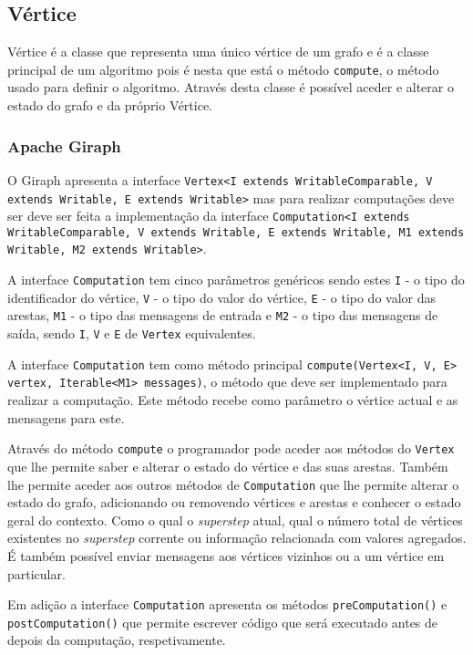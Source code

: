 \newpage
\subsection{Vértice}
Vértice é a classe que representa uma único vértice de um grafo e é a classe principal de um algoritmo pois é nesta que está o método \texttt{compute}, o método usado para definir o algoritmo. Através desta classe é possível aceder e alterar o estado do grafo e da próprio Vértice.
\subsubsection*{Apache Giraph}


O Giraph apresenta a interface \texttt{Vertex<I extends WritableComparable, V extends Writable, E extends Writable>} mas para realizar computações deve ser deve ser feita a implementação da interface \texttt{Computation<I extends WritableComparable, V extends Writable, E extends Writable, M1 extends Writable, M2 extends Writable>}.

A interface \texttt{Computation} tem cinco parâmetros genéricos sendo estes \texttt{I} - o tipo do identificador do vértice, \texttt{V} - o tipo do valor do vértice, \texttt{E} - o tipo do valor das arestas, \texttt{M1} - o tipo das mensagens de entrada e \texttt{M2} - o tipo das mensagens de saída, sendo \texttt{I}, \texttt{V} e \texttt{E} de \texttt{Vertex} equivalentes.

A interface \texttt{Computation} tem como método principal \texttt{compute(Vertex<I, V, E> vertex, Iterable<M1> messages)}, o método que deve ser implementado para realizar a computação. Este método recebe como parâmetro o vértice actual e as mensagens para este.

Através do método \texttt{compute} o programador pode aceder aos métodos do \texttt{Vertex} que lhe permite saber e alterar o estado do vértice e das suas arestas. Também lhe permite aceder aos outros métodos de \texttt{Computation} que lhe permite alterar o estado do grafo, adicionando ou removendo vértices e arestas e conhecer o estado geral do contexto. Como o qual o \textit{superstep} atual, qual o número total de vértices existentes no \textit{superstep} corrente ou informação relacionada com valores agregados. É também possível enviar mensagens aos vértices vizinhos ou a um vértice em particular.

Em adição a interface \texttt{Computation} apresenta os métodos \texttt{preComputation()} e \texttt{postComputation()} que permite escrever código que será executado antes de depois da computação, respetivamente.

